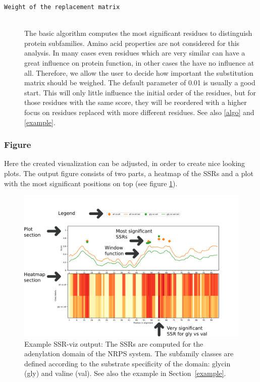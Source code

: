 \documentclass[a4paper,10pt]{article}
\begin{document}
\begin{description}
\item[\texttt{Weight of the replacement matrix}] \hfill \\

The basic algorithm computes the most significant residues to distinguish protein subfamilies. 
Amino acid properties are not considered for this analysis. In many cases
even residues which are very similar can have a great influence on protein function, in other cases
the have no influence at all. Therefore, we allow the user to decide how important the substitution matrix should be
weighed. 
The default parameter of 0.01 is usually a good start. This will only little influence the initial order of the residues,
but for those residues with the same score, they will be reordered with a higher focus on residues replaced with more different residues.
See also \ref{algo} and \ref{example}.

\end{description}

\subsubsection{Figure}

Here the created visualization can be adjusted, in order to create nice looking plots.
The output figure consists of two parts, a heatmap of the SSRs and a plot 
with the most significant positions on top (see figure \ref{fig:plot_example}).
 
\begin{figure}
  \includegraphics[width=\linewidth]{./figs/plot_example}
  \caption{Example SSR-viz output: The SSRs are computed for the adenylation domain of the NRPS system. 
  The subfamily classes are defined according to the substrate specificity of the domain: glycin (gly) and valine (val).
  See also the example in Section~\ref{example}.}
  \label{fig:plot_example}
\end{figure}
\end{document}
